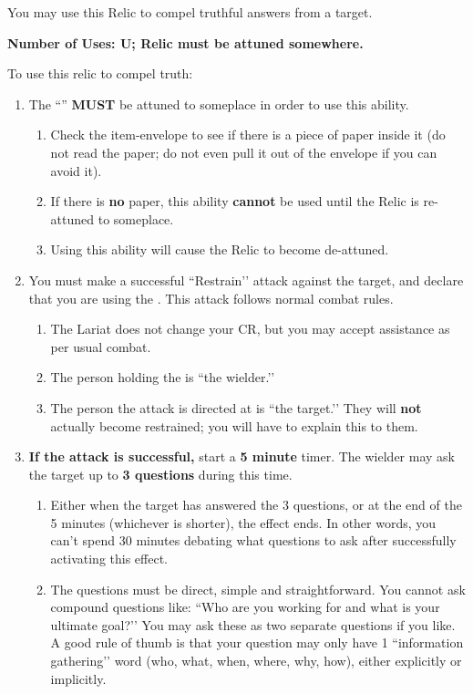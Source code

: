 \documentclass[green]{GL2020}
\begin{document}
\name{\gTruthRelic{}}

You may use this Relic to compel truthful answers from a target.

\textbf{Number of Uses: U; Relic must be attuned somewhere.}

To use this relic to compel truth:
\begin{enumerate}
  \item The ``\iLariat{}'' \textbf{MUST} be attuned to someplace in order to use this ability.
  \begin{enumerate}
    \item Check the item-envelope to see if there is a piece of paper inside it (do not read the paper; do not even pull it out of the envelope if you can avoid it).
    \item If there is \textbf{no} paper, this ability \textbf{cannot} be used until the Relic is re-attuned to someplace.
    \item Using this ability will cause the Relic to become de-attuned.
  \end{enumerate}
  \item You must make a successful ``Restrain’’ attack against the target, and declare that you are using the \iLariat{}. This attack follows normal combat rules.
   \begin{enumerate}
    \item The Lariat does not change your CR, but you may accept assistance as per usual combat.
    \item The person holding the \iLariat{} is ``the wielder.’’
    \item The person the attack is directed at is ``the target.’’ They will \textbf{not} actually become restrained; you will have to explain this to them.
  \end{enumerate}
  \item \textbf{If the attack is successful,} start a \textbf{5 minute} timer. The wielder may ask the target up to \textbf{3 questions} during this time.
  \begin{enumerate}
    \item Either when the target has answered the 3 questions, or at the end of the 5 minutes (whichever is shorter), the effect ends. In other words, you can’t spend 30 minutes debating what questions to ask after successfully activating this effect.
    \item The questions must be direct, simple and straightforward. You cannot ask compound questions like: ``Who are you working for and what is your ultimate goal?’’ You may ask these as two separate questions if you like. A good rule of thumb is that your question may only have 1 ``information gathering’’ word (who, what, when, where, why, how), either explicitly or implicitly.

\end{enumerate}
\end{enumerate}
\end{document}
